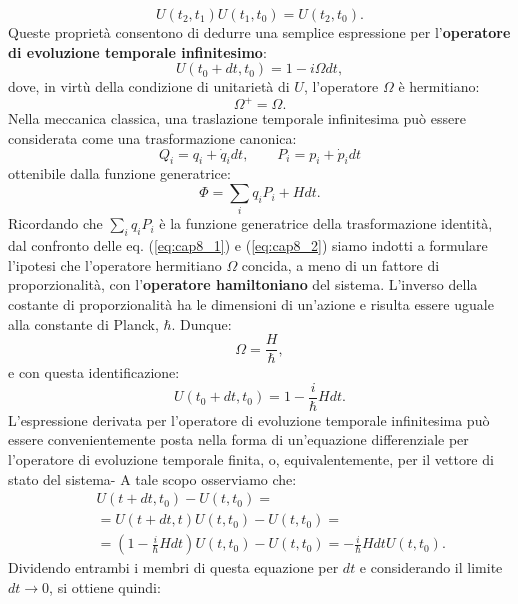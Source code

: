 \begin{equation}
U (t_2,t_1) U(t_1,t_0)=U(t_2,t_0).
\end{equation}
Queste proprietà consentono di dedurre una semplice espressione per l'\textbf{operatore di evoluzione temporale infinitesimo}:
\begin{equation}
U(t_0+dt,t_0) = 1-i\Omega dt,
\label{eq:cap8_1}
\end{equation}
dove, in virtù della condizione di unitarietà di $U$, l'operatore $\Omega$ è hermitiano:
\begin{equation}
\Omega ^+ = \Omega.
\end{equation}
Nella meccanica classica, una traslazione temporale infinitesima può essere considerata come una trasformazione canonica:
\begin{equation}
Q_i = q_i+\dot{q}_idt, \qquad P_i = p_i+\dot{p}_idt
\end{equation}
ottenibile dalla funzione generatrice:
\begin{equation}
\Phi = \sum _i q_iP_i+ Hdt.
\label{eq:cap8_2}
\end{equation}
Ricordando che $\sum _i q_iP_i$ è la funzione generatrice della trasformazione identità, dal confronto delle eq. (\ref{eq:cap8_1}) e (\ref{eq:cap8_2}) siamo indotti a formulare l'ipotesi che l'operatore hermitiano $\Omega$ concida, a meno di un fattore di proporzionalità, con l'\textbf{operatore hamiltoniano} del sistema. L'inverso della costante di proporzionalità ha le dimensioni di un'azione e risulta essere uguale alla constante di Planck, $\hbar$. Dunque:
\begin{equation}
\Omega = \frac{H}{\hbar},
\end{equation}
e con questa identificazione:
\begin{equation}
U(t_0+dt,t_0) =1-\frac{i}{\hbar}Hdt.
\end{equation}
L'espressione derivata per l'operatore di evoluzione temporale infinitesima può essere convenientemente posta nella forma di un'equazione differenziale per l'operatore di evoluzione temporale finita, o, equivalentemente, per il vettore di stato del sistema- A tale scopo osserviamo che:
\begin{eqnarray}
& &U(t+dt,t_0)-U(t,t_0)= \nonumber \\
& &= U(t+dt,t)U(t,t_0)-U(t,t_0)= \\
& &=\left(1-\frac{i}{\hbar}Hdt \right)U(t,t_0)-U(t,t_0)=-\frac{i}{\hbar}Hdt U(t,t_0).\nonumber
\end{eqnarray}
Dividendo entrambi i membri di questa equazione per $dt$ e considerando il limite $dt \longrightarrow 0$, si ottiene quindi:
